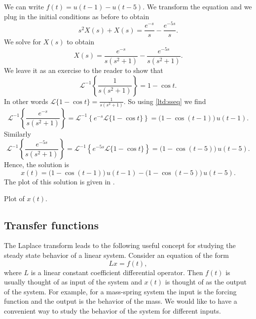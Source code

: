 \documentclass{ximera}
\begin{document}
\begin{exampleSol}
    We can write $f(t) = u(t-1) - u(t-5)$.  We transform the equation and we plug in the initial conditions as before to obtain
    \begin{equation*}
        s^2 X(s) + X(s) = \frac{e^{-s}}{s} - \frac{e^{-5s}}{s} .
    \end{equation*}
    We solve for $X(s)$ to obtain
    \begin{equation*}
        X(s) = \frac{e^{-s}}{s(s^2+1)} - \frac{e^{-5s}}{s(s^2+1)} .
    \end{equation*}
    We leave it as an exercise to the reader to show that
    \begin{equation*}
        {\mathcal{L}}^{-1} \left\{ \frac{1}{s(s^2+1)} \right\} = 1 - \cos t .
    \end{equation*}
    In other words $\mathcal{L} \{ 1 - \cos t  \} = \frac{1}{s(s^2+1)}$.  So using \eqref{ltd:sseq} we find
    \begin{equation*}
        {\mathcal{L}}^{-1} \left\{ \frac{e^{-s}}{s(s^2+1)} \right\} = {\mathcal{L}}^{-1} \left\{ e^{-s} \mathcal{L} \{ 1 - \cos t \} \right\} = \bigl( 1 - \cos (t-1) \bigr) \, u(t-1) .
    \end{equation*}
    Similarly
    \begin{equation*}
        {\mathcal{L}}^{-1} \left\{ \frac{e^{-5s}}{s(s^2+1)} \right\} = {\mathcal{L}}^{-1} \left\{ e^{-5s} \mathcal{L} \{ 1 - \cos t \} \right\} = \bigl( 1 - \cos (t-5) \bigr) \, u(t-5) .
    \end{equation*}
    Hence, the solution is
    \begin{equation*}
        x(t) =  \bigl( 1 - \cos (t-1) \bigr) \, u(t-1) - \bigl( 1 - \cos (t-5) \bigr) \, u(t-5) .
    \end{equation*}
    The plot of this solution is given in .
    
    \begin{myfig}
        \capstart
        \caption{Plot of $x(t)$.\label{lt:heavisideexfig}}
    \end{myfig}
\end{exampleSol}

\subsection{Transfer functions}

The Laplace transform leads to the following useful concept for studying the steady state behavior of a linear system.  Consider an equation of the form
\begin{equation*}
    L x = f(t) ,
\end{equation*}
where $L$ is a linear constant coefficient differential operator. Then $f(t)$ is usually thought of as input of the system and $x(t)$ is thought of as the output of the system.  For example, for a mass-spring system the input is the forcing function and the output is the behavior of the mass.  We would like to have a convenient way to study the behavior of the system for different inputs.
\end{document}
